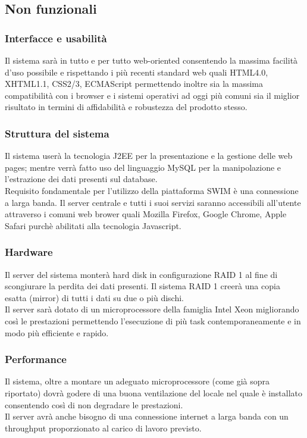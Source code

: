 \documentclass[a4paper,12pt]{article}
\begin{document}
\subsection{Non funzionali}
\vfill{}
\subsubsection{Interfacce e usabilità}
Il sistema sarà in tutto e per tutto web-oriented consentendo la massima facilità d'uso possibile e rispettando i più recenti standard web quali HTML4.0, XHTML1.1, CSS2/3, ECMAScript permettendo inoltre sia la massima compatibilità con i browser e i sistemi operativi ad oggi più comuni sia il miglior risultato in termini di affidabilità e robustezza del prodotto stesso.
\\[1.5em]
\subsubsection{Struttura del sistema}
Il sistema userà la tecnologia J2EE per la presentazione e la gestione delle web pages; mentre verrà fatto uso del linguaggio MySQL per la manipolazione e l'estrazione dei dati presenti sul database. \\[1\baselineskip]
Requisito fondamentale per l'utilizzo della piattaforma SWIM è una connessione a larga banda. Il server centrale e tutti i suoi servizi saranno accessibili all'utente attraverso i comuni web brower quali Mozilla Firefox, Google Chrome, Apple Safari purchè abilitati alla tecnologia Javascript.
\\[1.5em]
\subsubsection{Hardware}
Il server del sistema monterà hard disk in configurazione RAID 1 al fine di scongiurare la perdita dei dati presenti. Il sistema RAID 1 creerà una copia esatta (mirror) di tutti i dati su due o più dischi. \\[1\baselineskip]
Il server sarà dotato di un microprocessore della famiglia Intel Xeon migliorando così le prestazioni permettendo l'esecuzione di più task contemporaneamente e in modo più efficiente e rapido.
\\[1.5em]
\subsubsection{Performance}
Il sistema, oltre a montare un adeguato microprocessore (come già sopra riportato) dovrà godere di una buona ventilazione del locale nel quale è installato consentendo così di non degradare le prestazioni. \\[1\baselineskip]
Il server avrà anche bisogno di una connessione internet a larga banda con un throughput proporzionato al carico di lavoro previsto.
\vfill{}
\clearpage
\end{document}

